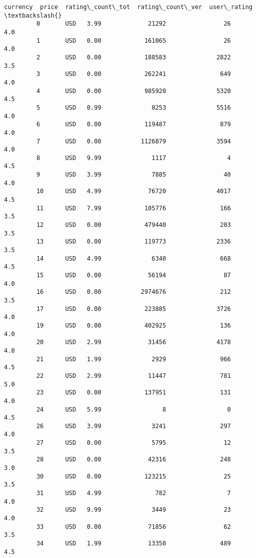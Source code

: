 \documentclass[11pt]{article}
\begin{document}
\begin{Verbatim}[commandchars=\\\{\}]
            currency  price  rating\_count\_tot  rating\_count\_ver  user\_rating  \textbackslash{}
         0       USD   3.99             21292                26          4.0   
         1       USD   0.00            161065                26          4.0   
         2       USD   0.00            188583              2822          3.5   
         3       USD   0.00            262241               649          4.0   
         4       USD   0.00            985920              5320          4.5   
         5       USD   0.99              8253              5516          4.0   
         6       USD   0.00            119487               879          4.0   
         7       USD   0.00           1126879              3594          4.0   
         8       USD   9.99              1117                 4          4.5   
         9       USD   3.99              7885                40          4.0   
         10      USD   4.99             76720              4017          4.5   
         11      USD   7.99            105776               166          3.5   
         12      USD   0.00            479440               203          3.5   
         13      USD   0.00            119773              2336          3.5   
         14      USD   4.99              6340               668          4.5   
         15      USD   0.00             56194                87          4.0   
         16      USD   0.00           2974676               212          3.5   
         17      USD   0.00            223885              3726          4.0   
         19      USD   0.00            402925               136          4.0   
         20      USD   2.99             31456              4178          4.0   
         21      USD   1.99              2929               966          4.5   
         22      USD   2.99             11447               781          5.0   
         23      USD   0.00            137951               131          4.0   
         24      USD   5.99                 8                 0          4.5   
         26      USD   3.99              3241               297          4.0   
         27      USD   0.00              5795                12          3.5   
         28      USD   0.00             42316               248          3.0   
         30      USD   0.00            123215                25          3.5   
         31      USD   4.99               782                 7          4.0   
         32      USD   9.99              3449                23          4.0   
         33      USD   0.00             71856                62          3.5   
         34      USD   1.99             13350               489          4.5   

\end{Verbatim}
\end{document}
